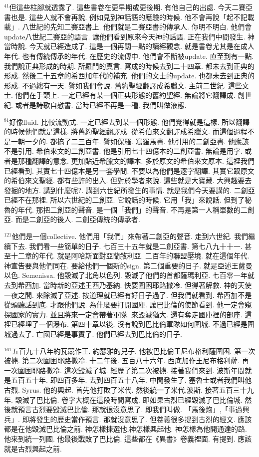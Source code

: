 \documentclass{book}
\begin{document}
$^{41}$但這些柱腳就透露了.
這些書卷在更早期或更後期.
有他自己的出處.
今天二賽亞書也是.
這些人就不會再說.
例如見到神話語的應驗的時候.
他不會再說「起不記載載」.
八世紀的先知二賽亞書上.
他們就是二賽亞書的傳承人.
你明不明白.
他們會update八世紀二賽亞的語言.
讓他們看到原來今天神的話語.
正在我們中間發生.
神當時說.
今天就已經造成了.
這是一個再闊一點的讀經觀念.
就是書卷尤其是在成人年代.
也有傳統傳承的年代.
在歷史的流傳中.
他們會不斷被update.
直至到有一點.
我們說正典形成的時期.
所羅門的真言.
寫成的時候去到二十四章.
都未去到正典的形成.
然後二十五章的希西加年代的補充.
他們的文士的update.
也都未去到正典的形成.
不過總有一天.
譬如我們會說.
舊約聖經翻譯成希臘文.
主前二世紀.
這些文士.
他們在手頭上.
一定已經有某一個正典形態的舊約聖經.
無論將它翻譯成.
創世紀.
或者是詩歌自慰書.
當時已經不再是一種.
我們叫做液態.

$^{81}$好像fluid.
比較流動式.
一定已經去到某一個形態.
他們覺得就是這樣.
所以翻譯的時候他們就是這樣.
將舊約聖經翻譯成.
從希伯來文翻譯成希臘文.
而這個過程不是一朝一夕的.
都搞了二三百年.
譬如保羅.
寫羅馬書.
他引用的二創亞書.
他應該不是引用.
希伯來文的二創亞書.
他是引用七十四億本的二創亞書.
無論是用字.
或者是那種翻譯的意念.
更加貼近希臘文的譯本.
多於原文的希伯來文原本.
這裡我們已經看到.
其實七十四億本是另一套學問.
不要以為他們是逐字翻譯.
其實它跟原文的希伯來文聖經.
都有些許的出入.
但對於學者來說.
這些就是大寶藏.
大興趣要去發掘的地方.
講到什麼呢?.
講到六世紀所發生的事情.
就是我們今天要講的.
二創亞已經不在那裡.
所以六世紀的二創亞.
它說話的時候.
它用「我」來說話.
但到了秘魯的年代.
那把二創亞的聲音.
是一個「我們」的聲音.
不再是第一人稱單數的二創亞.
而是二創亞的後人.
二創亞傳統的傳承者.

$^{121}$他們是一個collective.
他們用「我們」來帶著二創亞的聲音.
走到六世紀.
我們繼續下去.
我們看一些簡單的日子.
七百三十五年就是二創亞書.
第七八九十十一.
甚至十二章的年代.
就是阿哈斯面對亞蘭敘利亞.
二百年的聯盟壓境.
就在這個年代.
神宣告要與他們同在.
要給他們一個新的sign.
第二個重要的日子.
就是亞述王薩曼以色.
Semenissa.
他毀滅了北角以色列.
毀滅了他們的首都薩瑪利亞.
七百零一年就去到希西加.
當時新的亞述王西乃基納.
快要圍困耶路撒冷.
但得著解救.
神的天使一夜之間.
來除滅了亞述.
按道理就已經有好日子過了.
但我們就看到.
希西加不是從頭聽話到底.
才跟他們說.
為什麼要打開國庫.
讓巴比倫的使節看到.
他一定會窺探國家的實力.
並且將來一定會帶著軍隊.
來毀滅猶大.
還有奪走國庫裡的部座.
這裡已經埋了一個瀑布.
第四十章以後.
沒有說到巴比倫軍隊如何圍城.
不過已經是圍城過去了.
亡國已經是事實了.
他們已經去到巴比倫的日子.

$^{161}$五百九十八年約瓦競作王.
約瑟雅的兒子.
他被巴比倫王尼布格利薩圍困.
第一次被擄.
第二次圍困耶路撒冷.
十二年後.
五百八十六年.
西底加作王尼布格利薩.
再一次圍困耶路撒冷.
這次毀滅了城.
經歷了第二次被擄.
接著我們來到.
波斯年間就是五百五十年.
即四百多年.
去到四百五十八年.
中間發生了.
塞魯士或者我們叫他古烈.
Syrus.
他的興起.
首先他打敗了米代.
然後統一了米代,波斯.
接著五百三十九年.
毀滅了巴比倫.
卷字大概在這段時間寫成.
即如果古烈已經毀滅了巴比倫城.
然後就預言古烈要毀滅巴比倫.
那就很沒意思了.
即我們叫做.
「馬後炮」,「事過興兵」.
即將發生的歷史當作預言.
那就沒意思了.
但卷義很多提到古烈的經文.
應該都是在他毀滅巴比倫之前.
神怎樣揀選他,神怎樣興起他.
神怎樣為他開通達的路.
他來到統一列國.
他最後戰敗了巴比倫.
這些都在《異書》卷義裡面.
有提到.
應該就是古烈興起之前.
\end{document}

